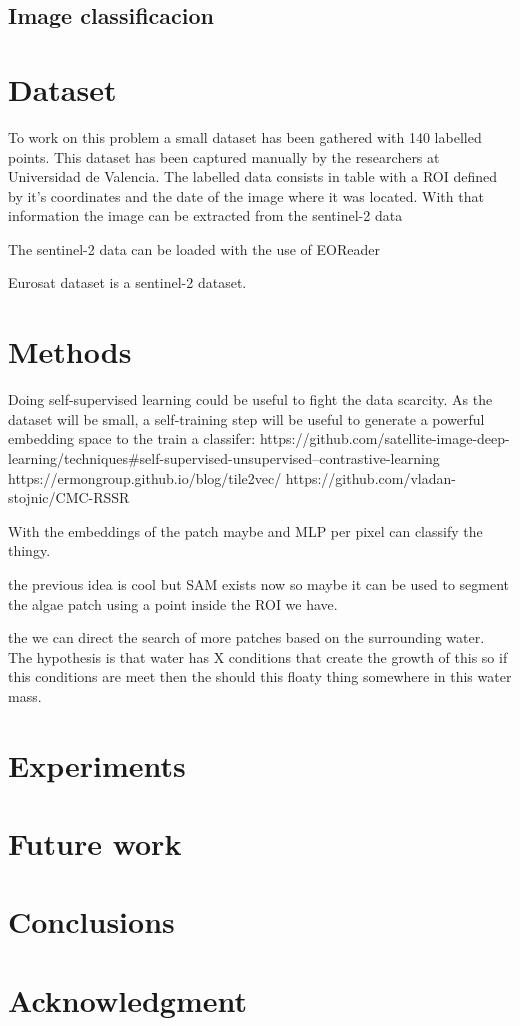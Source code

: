 \documentclass[conference]{IEEEtran}
\begin{document}
    \subsection{Image classificacion}


    \section{Dataset}
    To work on this problem a small dataset has been gathered with 140 labelled points.
    This dataset has been captured manually by the researchers at Universidad de Valencia.
    The labelled data consists in table with a ROI defined by it's coordinates and the date
    of the image where it was located.
    With that information the image can be extracted from the sentinel-2 data

    The sentinel-2 data can be loaded with the use of EOReader\citep{eoreader_paper}

    Eurosat dataset\citep{helber2019eurosat} is a sentinel-2 dataset.


    \section{Methods}



    Doing self-supervised learning could be useful to fight the data scarcity.\citep{OKELLY1987393}
    As the dataset will be small, a self-training step will be useful to generate
    a powerful embedding space to the train a classifer:
    https://github.com/satellite-image-deep-learning/techniques#self-supervised-unsupervised--contrastive-learning
    https://ermongroup.github.io/blog/tile2vec/
    https://github.com/vladan-stojnic/CMC-RSSR

    With the embeddings of the patch maybe and MLP per pixel can classify the thingy.


    the previous idea is cool but SAM exists now so maybe it can be used to segment the algae patch
    using a point inside the ROI we have.

    the we can direct the search of more patches based on the surrounding water.
    The hypothesis is that water has X conditions that create the growth of this so if this conditions
    are meet then the should this floaty thing somewhere in this water mass.


    \section{Experiments}


    \section{Future work}


    \section{Conclusions}

    \section*{Acknowledgment}

    
\end{document}
